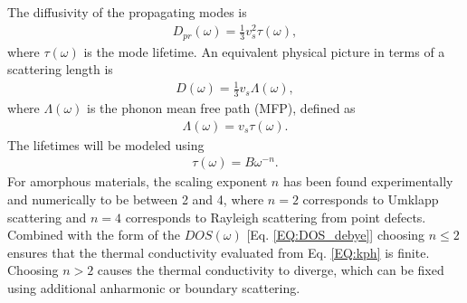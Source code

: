 \documentclass[aps,prb,onecolumn,preprint,superscriptaddress,footinbib,amsmath,amssymb,floatfix]{revtex4}
\begin{document}
The diffusivity of the propagating modes is    
\begin{equation}\label{EQ:Dtau}
\begin{split}
D_{pr}(\omega) = \frac{1}{3}v^2_s\tau(\omega),
\end{split}
\end{equation}
where $\tau(\omega)$ is 
the mode lifetime.\cite{ziman_electrons_2001} 
An equivalent physical picture in terms of a scattering length 
is
\begin{equation}\label{EQ:DLambda}
\begin{split}
D(\omega) = \frac{1}{3}v_s \Lambda(\omega),
\end{split}
\end{equation}
where $\Lambda(\omega)$ is the phonon mean free path (MFP), defined as 
\begin{equation}\label{EQ:Lambda}
\begin{split}
\Lambda(\omega) = v_{s} \tau(\omega).
\end{split}
\end{equation}
The lifetimes will be modeled using 
\begin{equation}\label{EQ:tauw2}
\begin{split}
\tau(\omega) = B \omega^{-n}.
\end{split}
\end{equation}
For amorphous materials, the scaling exponent $n$ 
has been found experimentally and numerically to be 
between 2 and 4,
\cite{vacher_ultrasonic_1981,
feldman_thermal_1993,morath_phonon_1996,benassi_evidence_1996,
feldman_numerical_1999,taraskin_determination_1999,
taraskin_propagation_2000,gotze_evolution_2000,ruocco_relaxation_2000,
ruocco_high-frequency_2001,horbach_high_2001,
matic_sound_2001,
feldman_calculations_2002,ruffle_observation_2003,
masciovecchio_evidence_2006,schirmacher_acoustic_2007,
christie_vibrational_2007,
shintani_universal_2008,xu_energy_2009,
liu_high_2009,ganter_rayleigh_2010,
vitelli_heat_2010,
baldi_sound_2010,yang_anomalously_2010,
wyart_scaling_2010,baldi_elastic_2011,
he_heat_2011,ayrinhac_subterahertz_2011,
baldi_emergence_2013}
where $n=2$ corresponds to 
Umklapp scattering\cite{callaway_model_1959} and $n=4$ corresponds to 
Rayleigh scattering from point defects.\cite{klemens_scattering_1955}
Combined with the form of the $DOS(\omega)$ [Eq. \eqref{EQ:DOS_debye}] 
choosing $n\le2$  
ensures that the 
thermal conductivity evaluated from Eq. \eqref{EQ:kph} is finite. 
Choosing $n>2$ causes the thermal conductivity to diverge,   
which can be fixed using additional anharmonic
\cite{feldman_thermal_1993,feldman_numerical_1999} 
or boundary scattering.
\cite{cahill_thermal_1994,liu_high_2009,yang_anomalously_2010}
\end{document}

